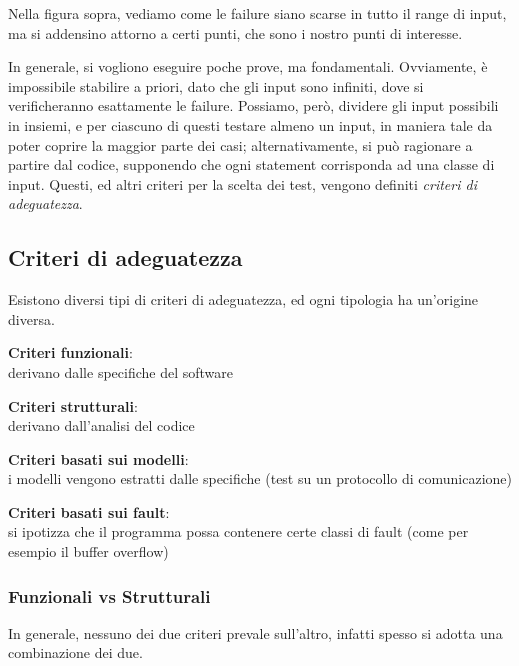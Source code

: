 Nella figura sopra, vediamo come le failure siano scarse in tutto il range di input, ma si addensino attorno a certi punti, che sono i nostro punti di interesse.

In generale, si vogliono eseguire poche prove, ma fondamentali. Ovviamente, è impossibile stabilire a priori, dato che gli input sono infiniti, dove si verificheranno esattamente le failure. Possiamo, però, dividere gli input possibili in insiemi, e per ciascuno di questi testare almeno un input, in maniera tale da poter coprire la maggior parte dei casi; alternativamente, si può ragionare a partire dal codice, supponendo che ogni statement corrisponda ad una classe di input. Questi, ed altri criteri per la scelta dei test, vengono definiti \textit{criteri di adeguatezza}.

\subsection{Criteri di adeguatezza}

Esistono diversi tipi di criteri di adeguatezza, ed ogni tipologia ha un'origine diversa.

\textbf{Criteri funzionali}: \\
derivano dalle specifiche del software

\textbf{Criteri strutturali}: \\
derivano dall'analisi del codice

\textbf{Criteri basati sui modelli}: \\
i modelli vengono estratti dalle specifiche (test su un protocollo di comunicazione)

\textbf{Criteri basati sui fault}: \\
si ipotizza che il programma possa contenere certe classi di fault (come per esempio il buffer overflow)

\subsubsection{Funzionali vs Strutturali}

In generale, nessuno dei due criteri prevale sull'altro, infatti spesso si adotta una combinazione dei due.

